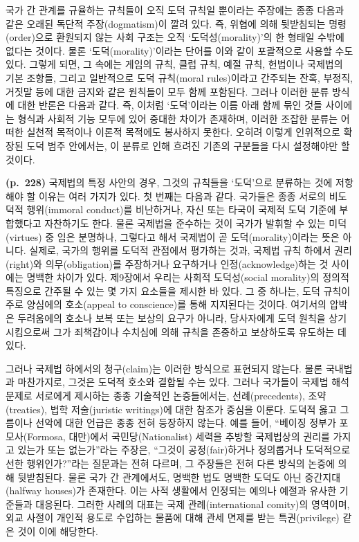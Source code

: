 국가 간 관계를 규율하는 규칙들이 오직 도덕 규칙일 뿐이라는 주장에는 종종
다음과 같은 오래된 독단적 주장(dogmatism)이 깔려 있다. 즉, 위협에 의해
뒷받침되는 명령(order)으로 환원되지 않는 사회 구조는 오직
`도덕성(morality)'의 한 형태일 수밖에 없다는 것이다. 물론
`도덕(morality)'이라는 단어를 이와 같이 포괄적으로 사용할 수도 있다.
그렇게 되면, 그 속에는 게임의 규칙, 클럽 규칙, 예절 규칙, 헌법이나
국제법의 기본 조항들, 그리고 일반적으로 도덕 규칙(moral rules)이라고
간주되는 잔혹, 부정직, 거짓말 등에 대한 금지와 같은 원칙들이 모두 함께
포함된다. 그러나 이러한 분류 방식에 대한 반론은 다음과 같다. 즉, 이처럼
`도덕'이라는 이름 아래 함께 묶인 것들 사이에는 형식과 사회적 기능 모두에
있어 중대한 차이가 존재하며, 이러한 조잡한 분류는 어떠한 실천적 목적이나
이론적 목적에도 봉사하지 못한다. 오히려 이렇게 인위적으로 확장된 도덕
범주 안에서는, 이 분류로 인해 흐려진 기존의 구분들을 다시 설정해야만 할
것이다.

\textbf{(p.~228)} 국제법의 특정 사안의 경우, 그것의 규칙들을 `도덕'으로
분류하는 것에 저항해야 할 이유는 여러 가지가 있다. 첫 번째는 다음과
같다. 국가들은 종종 서로의 비도덕적 행위(immoral conduct)를 비난하거나,
자신 또는 타국이 국제적 도덕 기준에 부합했다고 자찬하기도 한다. 물론
국제법을 준수하는 것이 국가가 발휘할 수 있는 미덕(virtues) 중
임은 분명하나, 그렇다고 해서 국제법이 곧
도덕(morality)이라는 뜻은 아니다. 실제로, 국가의 행위를 도덕적 관점에서
평가하는 것과, 국제법 규칙 하에서 권리(right)와 의무(obligation)를
주장하거나 요구하거나 인정(acknowledge)하는 것 사이에는 명백한 차이가
있다. 제9장에서 우리는 사회적 도덕성(social morality)의 정의적 특징으로
간주될 수 있는 몇 가지 요소들을 제시한 바 있다. 그 중 하나는, 도덕
규칙이 주로 양심에의 호소(appeal to conscience)를 통해 지지된다는
것이다. 여기서의 압박은 두려움에의 호소나 보복 또는 보상의 요구가
아니라, 당사자에게 도덕 원칙을 상기시킴으로써 그가 죄책감이나 수치심에
의해 규칙을 존중하고 보상하도록 유도하는 데 있다.

그러나 국제법 하에서의 청구(claim)는 이러한 방식으로 표현되지 않는다.
물론 국내법과 마찬가지로, 그것은 도덕적 호소와 결합될 수는 있다. 그러나
국가들이 국제법 해석 문제로 서로에게 제시하는 종종 기술적인
논증들에서는, 선례(precedents), 조약(treaties), 법학 저술(juristic
writings)에 대한 참조가 중심을 이룬다. 도덕적 옳고 그름이나 선악에 대한
언급은 종종 전혀 등장하지 않는다. 예를 들어, ``베이징 정부가
포모사(Formosa, 대만)에서 국민당(Nationalist) 세력을 추방할 국제법상의
권리를 가지고 있는가 또는 없는가''라는 주장은, ``그것이 공정(fair)하거나
정의롭거나 도덕적으로 선한 행위인가?''라는 질문과는 전혀 다르며, 그
주장들은 전혀 다른 방식의 논증에 의해 뒷받침된다. 물론 국가 간
관계에서도, 명백한 법도 명백한 도덕도 아닌 중간지대(halfway houses)가
존재한다. 이는 사적 생활에서 인정되는 예의나 예절과 유사한 기준들과
대응된다. 그러한 사례의 대표는 국제 관례(international comity)의
영역이며, 외교 사절이 개인적 용도로 수입하는 물품에 대해 관세 면제를
받는 특권(privilege) 같은 것이 이에 해당한다.

